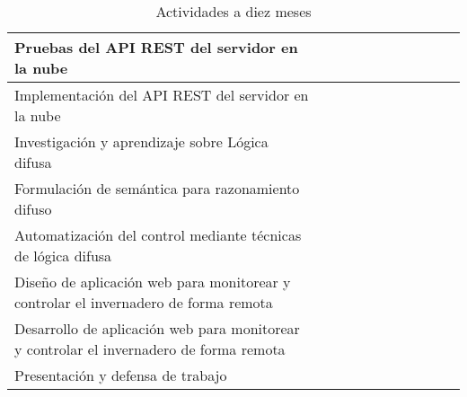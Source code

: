 \begin{table}[ht]
{\begin{tabular}{|p{8cm}|c|c|c|c|c|c|c|c|c|c|}
	\hline 
	Pruebas del API REST del servidor en la nube&  &  &  &  & \checkmark &  &  &  &  &  \\ 
	\hline 
	Implementación del API REST del servidor en la nube&  &  &  &  & \checkmark &  &  &  &  &  \\ 
	\hline 
	Investigación y aprendizaje sobre Lógica difusa&  &  &  & \checkmark &\checkmark  &\checkmark  &  &  &  & \\ 
	\hline 
	Formulación de semántica para razonamiento difuso&  &  &  &  &  &\checkmark  &  &  &  &  \\ 
	\hline 
	Automatización del control mediante técnicas de lógica difusa&  &  &  &  &  &  &  \checkmark & \checkmark &  &  \\ 
	\hline  
	Diseño de aplicación web para monitorear y controlar el invernadero de forma remota&  &  &  &  &  &  &  &  & \checkmark  &  \\ 
	\hline  
	Desarrollo de aplicación web para monitorear y controlar el invernadero de forma remota&  &  &  &  &  &  &  &  & \checkmark &  \\ 
	\hline  
	Presentación y defensa de trabajo&  &  &  &  &  &  &  &  &  & \checkmark  \\ 
	\hline
\end{tabular}}
    \caption{Actividades a diez meses}
\end{table}